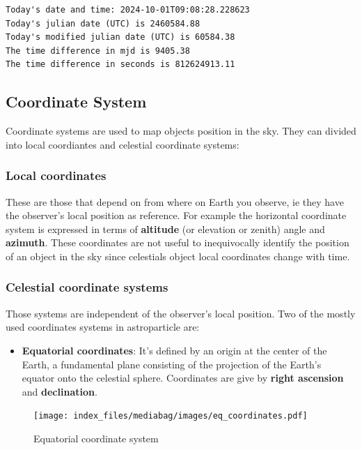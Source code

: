 \documentclass[
  letterpaper,
  DIV=11,
  numbers=noendperiod]{scrreprt}
\providecommand{\tightlist}{%
  \setlength{\itemsep}{0pt}\setlength{\parskip}{0pt}}\usepackage{longtable,booktabs,array}
\begin{document}
\begin{tcolorbox}[enhanced jigsaw, toprule=.15mm, colframe=quarto-callout-color-frame, bottomrule=.15mm, leftrule=.75mm, left=2mm, breakable, rightrule=.15mm, arc=.35mm, opacityback=0, colback=white]
\begin{verbatim}
Today's date and time: 2024-10-01T09:08:28.228623
Today's julian date (UTC) is 2460584.88
Today's modified julian date (UTC) is 60584.38
The time difference in mjd is 9405.38
The time difference in seconds is 812624913.11
\end{verbatim}

\end{tcolorbox}

\subsection{Coordinate System}\label{coordinate-system}

Coordinate systems are used to map objects position in the sky. They can
divided into local coordiantes and celestial coordinate systems:

\subsubsection{Local coordinates}\label{local-coordinates}

These are those that depend on from where on Earth you observe, ie they
have the observer's local position as reference. For example the
horizontal coordinate system is expressed in terms of \textbf{altitude}
(or elevation or zenith) angle and \textbf{azimuth}. These coordinates
are not useful to inequivocally identify the position of an object in
the sky since celestials object local coordinates change with time.

\subsubsection{Celestial coordinate
systems}\label{celestial-coordinate-systems}

Those systems are independent of the observer's local position. Two of
the mostly used coordinates systems in astroparticle are:

\begin{itemize}
\tightlist
\item
  \textbf{Equatorial coordinates}: It's defined by an origin at the
  center of the Earth, a fundamental plane consisting of the projection
  of the Earth's equator onto the celestial sphere. Coordinates are give
  by \textbf{right ascension} and \textbf{declination}.
\end{itemize}

\begin{figure}[H]

{\centering \texttt{[image: index\_files/mediabag/images/eq\_coordinates.pdf]}

}

\caption{Equatorial coordinate system}

\end{figure}%
\end{document}
